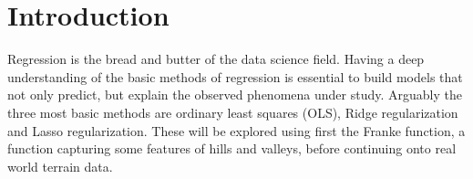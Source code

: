 \section{Introduction}

Regression is the bread and butter of the data science field. Having a deep
understanding of the basic methods of regression is essential to build models
that not only predict, but explain the observed phenomena under study. Arguably
the three most basic methods are ordinary least squares (OLS), Ridge
regularization and Lasso regularization. These will be explored using first the
Franke function, a function capturing some features of hills and valleys, before
continuing onto real world terrain data.

